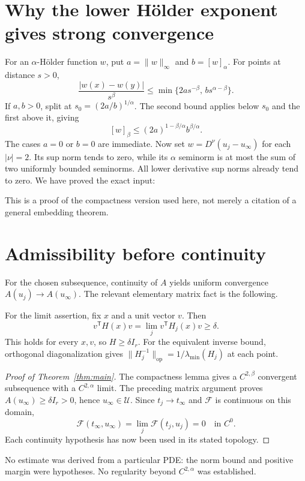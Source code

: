 \documentclass[12pt,reqno]{amsart}
\begin{document}
\section{Why the lower H\"older exponent gives strong convergence}
For an $\alpha$-H\"older function $w$, put $a=\|w\|_\infty$ and
$b=[w]_\alpha$. For points at distance $s>0$,
\[
 \frac{|w(x)-w(y)|}{s^\beta}
 \leq\min\{2a s^{-\beta},\,b s^{\alpha-\beta}\}.
\]
If $a,b>0$, split at $s_0=(2a/b)^{1/\alpha}$. The second bound applies
below $s_0$ and the first above it, giving
\[
 [w]_\beta\leq(2a)^{1-\beta/\alpha}b^{\beta/\alpha}.
\]
The cases $a=0$ or $b=0$ are immediate. Now set
$w=D^\nu(u_j-u_\infty)$ for each $|\nu|=2$. Its sup norm tends to zero,
while its $\alpha$ seminorm is at most the sum of two uniformly bounded seminorms.
All lower derivative sup norms already tend to zero. We have proved the exact input:
\begin{lemma}\label{lem:compactness}

\end{lemma}
This is a proof of the compactness version used here, not merely a citation
of a general embedding theorem.

\section{Admissibility before continuity}
For the chosen subsequence, continuity of $A$ yields uniform convergence
$A(u_j)\to A(u_\infty)$. The relevant elementary matrix fact is the following.
\begin{lemma}\label{lem:margin}

\end{lemma}
For the limit assertion, fix $x$ and a unit vector $v$. Then
\[
 v^{\mathsf T}H(x)v=\lim_j v^{\mathsf T}H_j(x)v\geq\delta.
\]
This holds for every $x,v$, so $H\geq\delta I_r$. For the equivalent inverse
bound, orthogonal diagonalization gives
$\|H_j^{-1}\|_{\mathrm{op}}=1/\lambda_{\min}(H_j)$ at each point.

\begin{proof}[Proof of Theorem~\ref{thm:main}]
The compactness lemma gives a $C^{2,\beta}$ convergent subsequence with a
$C^{2,\alpha}$ limit. The preceding matrix argument proves
$A(u_\infty)\geq\delta I_r>0$, hence $u_\infty\in\mathcal U$.
Since $t_j\to t_\infty$ and $\mathcal F$ is continuous on this domain,
\[
 \mathcal F(t_\infty,u_\infty)
 =\lim_j\mathcal F(t_j,u_j)=0\quad\text{in }C^0.
\]
Each continuity hypothesis has now been used in its stated topology.
\end{proof}
No estimate was derived from a particular PDE: the norm bound and positive
margin were hypotheses. No regularity beyond $C^{2,\alpha}$ was established.
\end{document}
